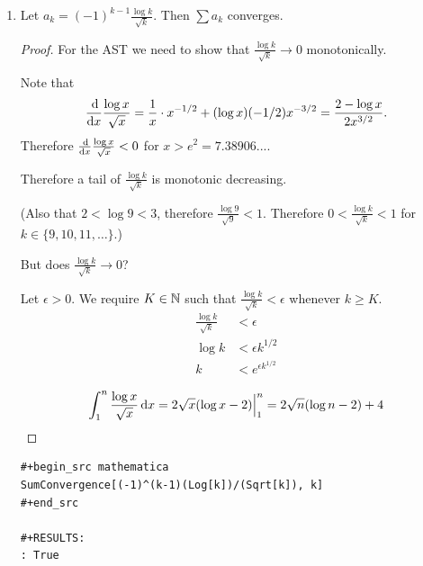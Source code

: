 \documentclass[12pt]{article}
\begin{document}
\begin{enumerate}[label=(\alph*)]
\begin{proof}
\begin{verbatim}
#+begin_src mathematica
SumConvergence[Sinh[k]/2^k, k]
#+end_src

#+RESULTS:
: False

\end{verbatim}
  \end{proof}


\newpage
\item

  \begin{claim*}
    Let $a_k = (-1)^{k-1}\frac{\log k}{\sqrt k}$. Then $\sum a_k$ converges.
  \end{claim*}

  \begin{proof}
    For the AST we need to show that $\frac{\log k}{\sqrt{k}} \to 0$ monotonically.

    Note that
    \begin{align*}
      \ddx \frac{\log x}{\sqrt{x}}
      = \frac{1}{x}\cdot x^{-1/2} + (\log x)(-1/2)x^{-3/2}
      = \frac{2 - \log x}{2x^{3/2}}.
    \end{align*}
    Therefore $\ddx \frac{\log x}{\sqrt{x}} < 0$ for $x > e^2 = 7.38906...$.

    Therefore a tail of $\frac{\log k}{\sqrt{k}}$ is monotonic decreasing.

    (Also that $2 < \log 9 < 3$, therefore $\frac{\log 9}{\sqrt{9}} < 1$. Therefore
    $0 < \frac{\log k}{\sqrt{k}} < 1$ for $k \in \{9, 10, 11, \ldots\}$.)

    But does $\frac{\log k}{\sqrt{k}} \to 0$?

    Let $\epsilon > 0$. We require $K \in \mathbb{N}$ such that $\frac{\log k}{\sqrt{k}} < \epsilon$
    whenever $k \geq K$.
    \begin{align*}
      \frac{\log k}{\sqrt{k}} &< \epsilon \\
      \log k                  &< \epsilon k^{1/2}\\
      k                       &< e^{\epsilon k^{1/2}}
    \end{align*}

    \begin{align*}
      \int_1^n \frac{\log x}{\sqrt{x}} \dx
      = 2\sqrt{x}(\log x - 2) \Big|_1^n
      = 2\sqrt{n}(\log n - 2) + 4
    \end{align*}

  \end{proof}


\begin{verbatim}
#+begin_src mathematica
SumConvergence[(-1)^(k-1)(Log[k])/(Sqrt[k]), k]
#+end_src

#+RESULTS:
: True

\end{verbatim}

\end{enumerate}
\end{document}
